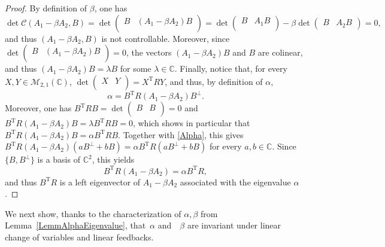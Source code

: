 \documentclass[10pt]{article}
\theoremstyle{plain}
\theoremstyle{definition}
\newcommand{\transp}{{\scriptscriptstyle\mathrm{T}}}
\numberwithin{equation}{section}\numberwithin{figure}{section}\emergencystretch=3em
\begin{document}
\begin{proof}
By definition of $\beta$, one has
\[\det\mathcal C(A_1 - \beta A_2, B) = \det\begin{pmatrix} B & (A_1 - \beta A_2) B\\\end{pmatrix} = \det\begin{pmatrix} B & A_1 B\\\end{pmatrix} - \beta \det\begin{pmatrix}B & A_2 B\end{pmatrix} = 0,\]
and thus $(A_1 - \beta A_2, B)$ is not controllable. Moreover, since $\det\begin{pmatrix} B & (A_1 - \beta A_2) B\\\end{pmatrix}  = 0$, the vectors $(A_1 - \beta A_2) B$ and $B$ are colinear, and thus $(A_1 - \beta A_2) B = \lambda B$ for some $\lambda \in \mathbb C$. Finally, notice that, for every $X, Y \in \mathcal M_{2, 1}(\mathbb C)$, $\det\begin{pmatrix}X & Y\\\end{pmatrix} = X^\transp R Y$, and thus, by definition of $\alpha$,
\begin{equation}
\label{Alpha}
\alpha = B^\transp R (A_1 - \beta A_2) B^\perp.
\end{equation}
Moreover, one has $B^\transp R B = \det\begin{pmatrix}B & B \\\end{pmatrix} = 0$ and $B^\transp R (A_1 - \beta A_2) B = \lambda B^\transp R B = 0$, which shows in particular that $B^\transp R (A_1 - \beta A_2) B = \alpha B^\transp R B$. Together with \eqref{Alpha}, this gives $B^\transp R (A_1 - \beta A_2) (a B^\perp  + b B) = \alpha B^\transp R (a B^\perp + b B)$ for every $a, b \in \mathbb C$. Since $\{B, B^\perp\}$ is a basis of $\mathbb C^2$, this yields
\[B^\transp R (A_1 - \beta A_2) = \alpha B^\transp R,\]
and thus $B^\transp R$ is a left eigenvector of $A_1 - \beta A_2$ associated with the eigenvalue $\alpha$.
\end{proof}

We next show, thanks to the characterization of $\alpha, \beta$ from Lemma~\ref{LemmAlphaEigenvalue}, that~$\alpha$ and~ $\beta$ are invariant under linear change of variables and linear feedbacks.
\end{document}
